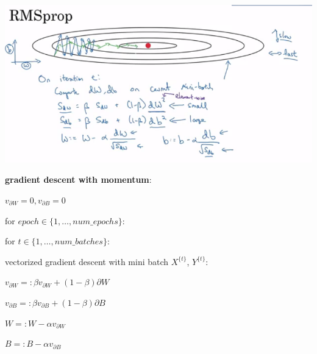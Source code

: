 \documentclass{article}
\begin{document}
\begin{center}
\includegraphics[scale=0.4]{./images/momentum_gradient_descent.png}
\end{center}

\noindent \textbf{gradient descent with momentum}:

\noindent \(v_{\partial W} = 0, v_{\partial B} = 0\)

\noindent for \(epoch \in \{1, \dots, num\_epochs\}\):

\noindent \hspace{.5cm} for \(t \in \{1, \dots, num\_batches\}\):

\noindent \hspace{1cm} vectorized gradient descent with mini batch \(X^{\{t\}}\), \(Y^{\{t\}}\):

\noindent \hspace{1cm} \(v_{\partial W} =: \beta v_{\partial W} + (1 - \beta) \partial W\)

\noindent \hspace{1cm} \(v_{\partial B} =: \beta v_{\partial B} + (1 - \beta) \partial B\)

\noindent \hspace{1cm} \(W =: W - \alpha v_{\partial W}\)

\noindent \hspace{1cm} \(B =: B - \alpha v_{\partial B}\)

\printindex
\end{document}
